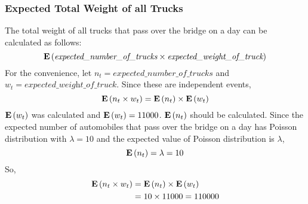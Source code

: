 \subsubsection*{Expected Total Weight of all Trucks}


\noindent The total weight of all trucks that pass over the bridge on a day can be calculated as follows:
\begin{equation*}
  \mathbf{E}\left( \textit{expected\_number\_of\_trucks} \times \textit{expected\_weight\_of\_truck} \right)
\end{equation*}
For the convenience, let $n_t = \textit{expected\_number\_of\_trucks}$ and $w_t = \textit{expected\_weight\_of\_truck}$. Since these are independent events,
\begin{equation*}
  \mathbf{E}\left( n_t \times w_t \right) = \mathbf{E}\left(n_t\right) \times \mathbf{E}\left(w_t\right)
\end{equation*}
$\mathbf{E}\left(w_t\right)$ was calculated and $\mathbf{E}\left(w_t\right) = 11000$. $\mathbf{E}\left(n_t\right)$ should be calculated. Since the expected number of automobiles that pass over the bridge on a day has Poisson distribution with $\lambda = 10$ and the expected value of Poisson distribution is $\lambda$,
\begin{equation*}
  \mathbf{E}\left(n_t\right) = \lambda = 10
\end{equation*}
So,
\begin{align*}
  \mathbf{E}\left( n_t \times w_t \right) &= \mathbf{E}\left(n_t\right) \times \mathbf{E}\left(w_t\right) \\
                          &= 10 \times 11000 = 110000
\end{align*}
